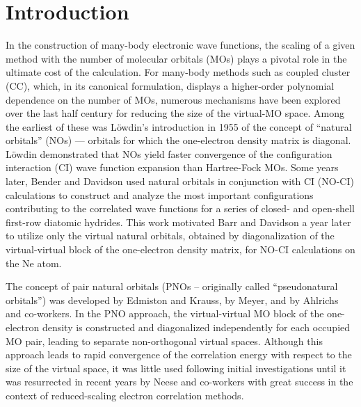 \section{Introduction}
In the construction of many-body electronic wave functions, the scaling of a
given method with the number of molecular orbitals (MOs) plays a pivotal role
in the ultimate cost of the calculation.  For many-body methods such as
coupled cluster (CC),\cite{Shavitt09,Gauss98,Crawford00:review} which, in its
canonical formulation, displays a higher-order polynomial dependence on the
number of MOs, numerous mechanisms have been explored over the last half
century for reducing the size of the virtual-MO space.  Among the earliest of
these was L{\"o}wdin's\cite{Lowdin55} introduction in 1955 of the concept of
``natural orbitals'' (NOs) --- orbitals for which the one-electron density
matrix is diagonal.  L\"owdin demonstrated that NOs yield faster convergence
of the configuration interaction (CI) wave function expansion than Hartree-Fock MOs.  Some years later,
Bender and Davidson\cite{Bender69} used natural orbitals in conjunction with
CI (NO-CI) calculations to construct and analyze the most important
configurations contributing to the correlated wave functions for a series of
closed- and open-shell first-row diatomic hydrides.  This work motivated Barr
and Davidson a year later\cite{Barr70} to utilize only the virtual natural
orbitals, obtained by diagonalization of the virtual-virtual block of
the one-electron density matrix, for NO-CI calculations on the Ne atom.

The concept of pair natural orbitals (PNOs -- originally called
``pseudonatural orbitals'') was developed by Edmiston and
Krauss,\cite{Edmiston66} by Meyer\cite{Meyer73}, and by Ahlrichs and
co-workers.\cite{Ahlrichs75} In the PNO approach, the virtual-virtual MO block
of the one-electron density is constructed and diagonalized independently for
each occupied MO pair, leading to separate non-orthogonal virtual spaces.
Although this approach leads to rapid convergence of the correlation energy
with respect to the size of the virtual space, it was little used following
initial investigations until it was resurrected in recent years by Neese and
co-workers with great success in the context of reduced-scaling electron
correlation methods.\cite{Neese09,Riplinger16}

